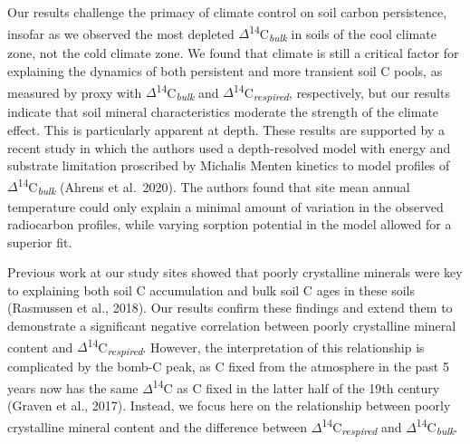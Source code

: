 \documentclass[english,man,floatsintext]{apa6}
\begin{document}
Our results challenge the primacy of climate control on soil carbon persistence, insofar as we observed the most depleted \(\Delta\)\textsuperscript{14}C\textsubscript{\emph{bulk}} in soils of the cool climate zone, not the cold climate zone. We found that climate is still a critical factor for explaining the dynamics of both persistent and more transient soil C pools, as measured by proxy with \(\Delta\)\textsuperscript{14}C\textsubscript{\emph{bulk}} and \(\Delta\)\textsuperscript{14}C\textsubscript{\emph{respired}}, respectively, but our results indicate that soil mineral characteristics moderate the strength of the climate effect. This is particularly apparent at depth. These results are supported by a recent study in which the authors used a depth-resolved model with energy and substrate limitation proscribed by Michalis Menten kinetics to model profiles of \(\Delta\)\textsuperscript{14}C\textsubscript{\emph{bulk}} (Ahrens et al.~2020). The authors found that site mean annual temperature could only explain a minimal amount of variation in the observed radiocarbon profiles, while varying sorption potential in the model allowed for a superior fit.

Previous work at our study sites showed that poorly crystalline minerals were key to explaining both soil C accumulation and bulk soil C ages in these soils (Rasmussen et al., 2018). Our results confirm these findings and extend them to demonstrate a significant negative correlation between poorly crystalline mineral content and \(\Delta\)\textsuperscript{14}C\textsubscript{\emph{respired}}. However, the interpretation of this relationship is complicated by the bomb-C peak, as C fixed from the atmosphere in the past 5 years now has the same \(\Delta\)\textsuperscript{14}C as C fixed in the latter half of the 19th century (Graven et al., 2017). Instead, we focus here on the relationship between poorly crystalline mineral content and the difference between \(\Delta\)\textsuperscript{14}C\textsubscript{\emph{respired}} and \(\Delta\)\textsuperscript{14}C\textsubscript{\emph{bulk}}.
\end{document}
